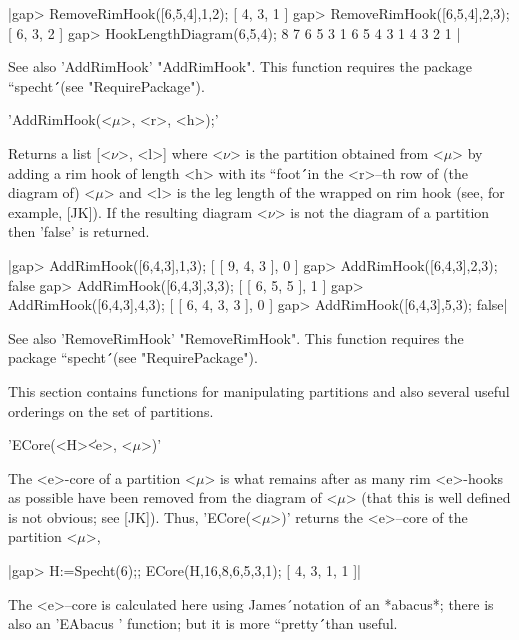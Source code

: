 |gap> RemoveRimHook([6,5,4],1,2);
[ 4, 3, 1 ]
gap> RemoveRimHook([6,5,4],2,3);
[ 6, 3, 2 ]
gap> HookLengthDiagram(6,5,4);
   8   7   6   5   3   1
   6   5   4   3   1
   4   3   2   1 |

See also 'AddRimHook' "AddRimHook". This function requires the package
``specht\'\'\ (see "RequirePackage").



'AddRimHook(<$\mu$>, <r>, <h>);'

Returns a list [<$\nu$>, <l>] where <$\nu$> is the partition obtained from
<$\mu$> by adding a rim hook of length <h> with its ``foot\'\'\ in the 
<r>--th row of (the diagram of) <$\mu$> and <l> is the leg length of the 
wrapped on rim hook (see, for example, [JK]). If the resulting diagram 
<$\nu$> is not the diagram of a partition then 'false' is returned.

|gap> AddRimHook([6,4,3],1,3);
[ [ 9, 4, 3 ], 0 ]
gap> AddRimHook([6,4,3],2,3);
false
gap> AddRimHook([6,4,3],3,3);
[ [ 6, 5, 5 ], 1 ]
gap> AddRimHook([6,4,3],4,3);
[ [ 6, 4, 3, 3 ], 0 ]
gap> AddRimHook([6,4,3],5,3);
false|

See also 'RemoveRimHook' "RemoveRimHook". This function requires the 
package ``specht\'\'\ (see "RequirePackage").



This section contains functions for manipulating partitions and
also several useful orderings on the set of partitions.



'ECore(<H>\|<e>, <$\mu$>)'

The <e>-core of a partition <$\mu$> is what remains after as many rim 
<e>-hooks as possible have been removed from the diagram of <$\mu$>
(that this is well defined is not obvious; see [JK]). Thus, 
'ECore(<$\mu$>)' returns the <e>--core of the partition <$\mu$>, 

|gap> H:=Specht(6);; ECore(H,16,8,6,5,3,1);
[ 4, 3, 1, 1 ]|

The <e>--core is calculated here using James\'\ notation of an *abacus*; 
there is also an 'EAbacus ' function; but it is more ``pretty\'\'\ than 
useful. 


